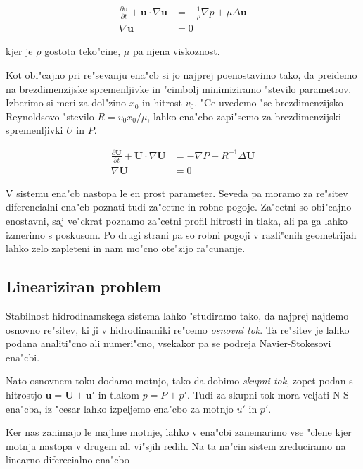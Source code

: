 \documentclass[a4paper,10pt]{article}
\renewcommand{\vec}{\mathbf}
\begin{document}
\begin{align}
 \label{eq:ns-enacba}
\frac{\partial \vec u}{\partial t} + \vec u \cdot \nabla \vec u &= -\frac{1}{\rho}\nabla p + \mu \Delta \vec u \\
\nabla \vec u &= 0
\end{align}

kjer je $\rho$ gostota teko"cine, $\mu$ pa njena viskoznost. 

Kot obi"cajno pri re"sevanju ena"cb si jo najprej poenostavimo tako, da preidemo na brezdimenzijske spremenljivke in "cimbolj minimiziramo "stevilo parametrov. Izberimo si meri za dol"zino $x_0$ in hitrost $v_0$. "Ce uvedemo "se brezdimenzijsko Reynoldsovo "stevilo $R=v_0 x_0 / \mu$, lahko ena"cbo zapi"semo za brezdimenzijski spremenljivki $U$ in $P$. 

\begin{align}
 \label{eq:ns-brezdim}
\frac{\partial \vec U}{\partial t} + \vec U \cdot \nabla \vec U &= -\nabla P + R^{-1} \Delta \vec U \\
\nabla \vec U &= 0
\end{align}

V sistemu ena"cb nastopa le en prost parameter. Seveda pa moramo za re"sitev diferencialni ena"cb poznati tudi za"cetne in robne pogoje. Za"cetni so obi"cajno enostavni, saj ve"ckrat poznamo za"cetni profil hitrosti in tlaka, ali pa ga lahko izmerimo s poskusom. Po drugi strani pa so robni pogoji v razli"cnih geometrijah lahko zelo zapleteni in nam mo"cno ote"zijo ra"cunanje. 

\subsection{Lineariziran problem}

Stabilnost hidrodinamskega sistema lahko "studiramo tako, da najprej najdemo osnovno re"sitev, ki ji v hidrodinamiki re"cemo \emph{osnovni tok}. Ta re"sitev je lahko podana analiti"cno ali numeri"cno, vsekakor pa se podreja Navier-Stokesovi ena"cbi. 

Nato osnovnem toku dodamo motnjo, tako da dobimo \emph{skupni tok}, zopet podan s hitrostjo $\vec u = \vec U + \vec u'$ in tlakom $p = P + p'$. Tudi za skupni tok mora veljati N-S ena"cba, iz "cesar lahko izpeljemo ena"cbo za motnjo $u'$ in $p'$. 

Ker nas zanimajo le majhne motnje, lahko v ena"cbi zanemarimo vse "clene kjer motnja nastopa v drugem ali vi"sjih redih. Na ta na"cin sistem zreduciramo na linearno diferecialno ena"cbo 
\end{document}
